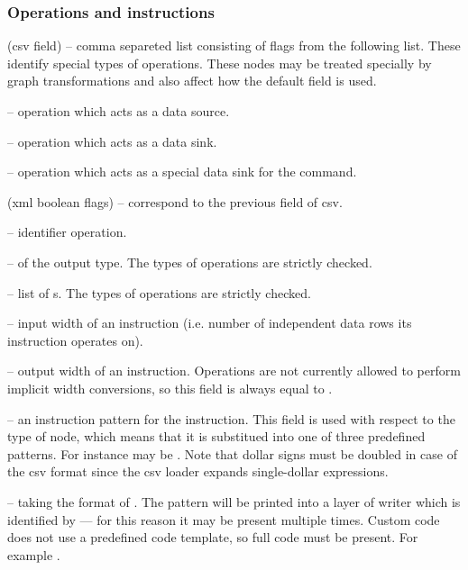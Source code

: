 \subsubsection{Operations and instructions}
  \begin{description}
  \item {} (csv field) -- comma separeted list consisting of flags from the following list. These identify special types of operations. These nodes may be treated specially by graph transformations and also affect how the default  field is used.
  \begin{description}
	\item {} -- operation which acts as a data source. 
	\item {} -- operation which acts as a data sink.
	\item {} -- operation which acts as a special data sink for the  command.
  \end{description}
  \item {} (xml boolean flags) -- correspond to the previous field of csv.
  \item{} -- identifier operation.
  \item{} --  of the output type. The types of operations are strictly checked.
  \item{} -- list of s. The types of operations are strictly checked.
\item{} -- input width of an instruction (i.e. number of independent data rows its instruction operates on).
  \item{} -- output width of an instruction. Operations are not currently allowed to perform implicit width conversions, so this field is always equal to .
  \item{} -- an instruction pattern for the instruction. This field is used with respect to the type of node, which means that it is substitued into one of three predefined patterns. For instance  may be . Note that dollar signs must be doubled in case of the csv format since the csv loader expands single-dollar expressions.
  \item{} -- taking the format of  . The pattern will be printed into a layer of writer which is identified by  --- for this reason it may be present multiple times. Custom code does not use a predefined code template, so full code must be present. For example .
\end{description}

